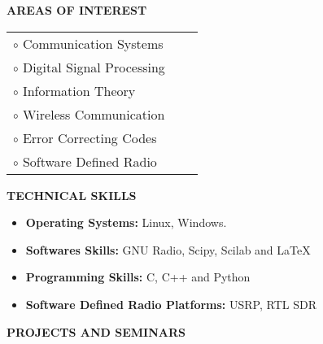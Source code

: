 \documentclass[a4paper,10pt]{article}
\begin{document}
{\qquad \\ \\ \\ \\ \\ \\ \\ \\ \\ \\}

\colorbox{titleColor}{\parbox{6.5in}{\textbf{AREAS OF INTEREST}}}

 \begin{tabular}{p{3.5in}p{5in}p{3.5in}}
    $\circ$ Communication Systems \\
    $\circ$ Digital Signal Processing \\
    $\circ$ Information Theory \\
    $\circ$ Wireless Communication \\
    $\circ$ Error Correcting Codes \\
    $\circ$ Software Defined Radio
  \end{tabular}

 \colorbox{titleColor}{\parbox{6.5in}{\textbf{TECHNICAL SKILLS}}}
 
 \begin{itemize}
 \setlength{\itemsep}{1pt}
 \item \textbf{{Operating Systems:}} Linux, Windows.
 \item \textbf{{Softwares Skills:}} GNU Radio, Scipy, Scilab and \LaTeX
 \item \textbf{{Programming Skills:}} C, C++ and Python
 \item \textbf{{Software Defined Radio Platforms:}} USRP, RTL SDR
 \end{itemize}

 \colorbox{titleColor}{\parbox{6.5in}{\textbf{PROJECTS AND SEMINARS}}}
\end{document}
